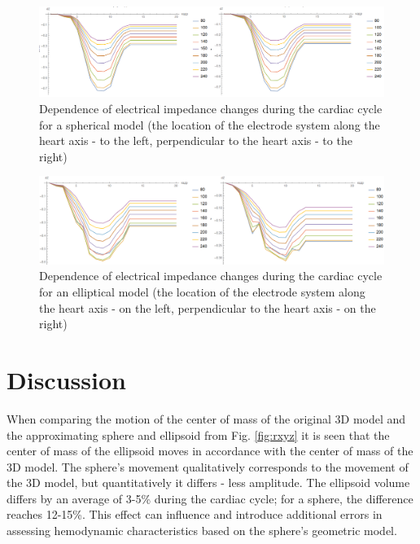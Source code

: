 \documentclass[conference]{IEEEtran}
\begin{document}
\begin{figure}[tbph]
    \centering
    \includegraphics[width=\linewidth]{fig/sphere}
    \caption{Dependence of electrical impedance changes during the cardiac cycle for a spherical model (the location of the electrode system along the heart axis - to the left, perpendicular to the heart axis - to the right)}
    \label{fig:sphere}
\end{figure}

\begin{figure}[tbph]
    \centering
    \includegraphics[width=\linewidth]{ellipse}
    \caption{Dependence of electrical impedance changes during the cardiac cycle for an elliptical model (the location of the electrode system along the heart axis - on the left, perpendicular to the heart axis - on the right)}
    \label{fig:ellipse}
\end{figure}

\section{Discussion}

When comparing the motion of the center of mass of the original 3D model and the
approximating sphere and ellipsoid from Fig. \ref{fig:rxyz} it is seen that the
center of mass of the ellipsoid moves in accordance with the center of mass of
the 3D model. The sphere's movement qualitatively corresponds to the movement of
the 3D model, but quantitatively it differs - less amplitude. The ellipsoid
volume differs by an average of 3-5\% during the cardiac cycle; for a sphere,
the difference reaches 12-15\%. This effect can influence and introduce
additional errors in assessing hemodynamic characteristics based on the sphere's
geometric model.
\end{document}
